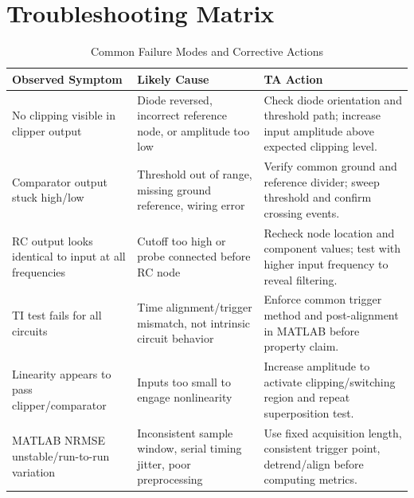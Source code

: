 \documentclass[11pt,letterpaper]{article}
\begin{document}
\section{Troubleshooting Matrix}

\begin{table}[h!]
\centering
\caption{Common Failure Modes and Corrective Actions}
\begin{tabular}{p{} p{} p{}}
\toprule
\textbf{Observed Symptom} & \textbf{Likely Cause} & \textbf{TA Action} \\
\midrule
No clipping visible in clipper output & Diode reversed, incorrect reference node, or amplitude too low & Check diode orientation and threshold path; increase input amplitude above expected clipping level. \\
Comparator output stuck high/low & Threshold out of range, missing ground reference, wiring error & Verify common ground and reference divider; sweep threshold and confirm crossing events. \\
RC output looks identical to input at all frequencies & Cutoff too high or probe connected before RC node & Recheck node location and component values; test with higher input frequency to reveal filtering. \\
TI test fails for all circuits & Time alignment/trigger mismatch, not intrinsic circuit behavior & Enforce common trigger method and post-alignment in MATLAB before property claim. \\
Linearity appears to pass clipper/comparator & Inputs too small to engage nonlinearity & Increase amplitude to activate clipping/switching region and repeat superposition test. \\
MATLAB NRMSE unstable/run-to-run variation & Inconsistent sample window, serial timing jitter, poor preprocessing & Use fixed acquisition length, consistent trigger point, detrend/align before computing metrics. \\
\bottomrule
\end{tabular}
\end{table}
\end{document}
